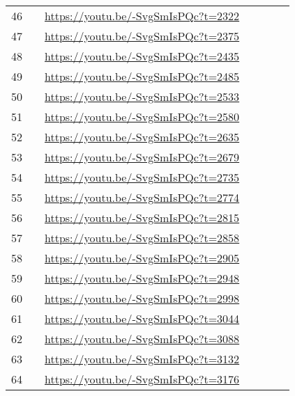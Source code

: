 \begin{longtable*}[]{ccp{2.0cm} p{5.0cm} p{5.0cm} p{5.0cm} p{5.0cm}}
46 &  & \url{https://youtu.be/-SvgSmIsPQc?t=2322} \\
47 &  & \url{https://youtu.be/-SvgSmIsPQc?t=2375} \\
48 &  & \url{https://youtu.be/-SvgSmIsPQc?t=2435} \\
49 &  & \url{https://youtu.be/-SvgSmIsPQc?t=2485} \\
50 &  & \url{https://youtu.be/-SvgSmIsPQc?t=2533} \\
51 &  & \url{https://youtu.be/-SvgSmIsPQc?t=2580} \\
52 &  & \url{https://youtu.be/-SvgSmIsPQc?t=2635} \\
53 &  & \url{https://youtu.be/-SvgSmIsPQc?t=2679} \\
54 &  & \url{https://youtu.be/-SvgSmIsPQc?t=2735} \\
55 &  & \url{https://youtu.be/-SvgSmIsPQc?t=2774} \\
56 &  & \url{https://youtu.be/-SvgSmIsPQc?t=2815} \\
57 &  & \url{https://youtu.be/-SvgSmIsPQc?t=2858} \\
58 &  & \url{https://youtu.be/-SvgSmIsPQc?t=2905} \\
59 &  & \url{https://youtu.be/-SvgSmIsPQc?t=2948} \\
60 &  & \url{https://youtu.be/-SvgSmIsPQc?t=2998} \\
61 &  & \url{https://youtu.be/-SvgSmIsPQc?t=3044} \\
62 &  & \url{https://youtu.be/-SvgSmIsPQc?t=3088} \\
63 &  & \url{https://youtu.be/-SvgSmIsPQc?t=3132} \\
64 &  & \url{https://youtu.be/-SvgSmIsPQc?t=3176} \\

\end{longtable*}
